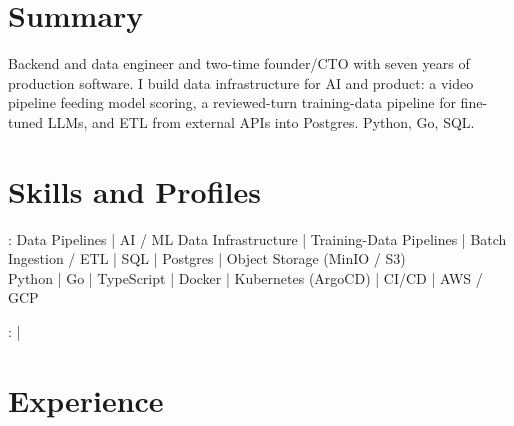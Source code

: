 \documentclass[print]{jack-resume}
\begin{document}
\pagecolor{darkmodeBackground}


\begin{minipage}[t][1cm][t]{.03\textwidth}
    \hfill
\end{minipage}

\section{Summary}
Backend and data engineer and two-time founder/CTO with seven years of production software. I build data infrastructure for AI and product: a video pipeline feeding model scoring, a reviewed-turn training-data pipeline for fine-tuned LLMs, and ETL from external APIs into Postgres. Python, Go, SQL.
\sectionsep

\section{Skills and Profiles}
:
Data Pipelines \hfill | \hfill
AI / ML Data Infrastructure \hfill | \hfill
Training-Data Pipelines \hfill | \hfill
Batch Ingestion / ETL \hfill | \hfill
SQL \hfill | \hfill
Postgres \hfill | \hfill
Object Storage (MinIO / S3) \\
\hspace{1.0cm} Python \hfill | \hfill
Go \hfill | \hfill
TypeScript \hfill | \hfill
Docker \hfill | \hfill
Kubernetes (ArgoCD) \hfill | \hfill
CI/CD \hfill | \hfill
AWS / GCP \\

\raggedright{
    :
      \href{https://www.linkedin.com/in/jack-sturtevant/}{ \ExternalLink} |
     \href{https://github.com/jacksturt}{ \ExternalLink}}

\section{Experience}
\end{document}
